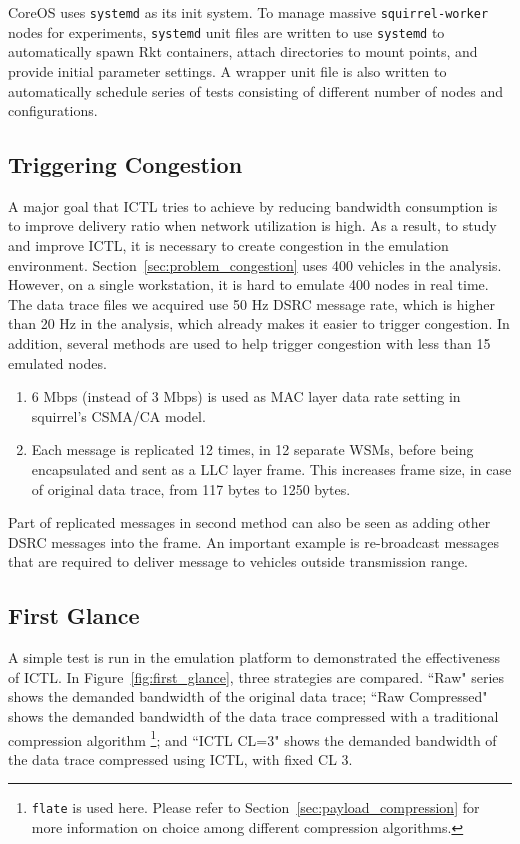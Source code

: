 \documentclass[12pt]{report}
\begin{document}
CoreOS uses \texttt{systemd} as its init system. To manage massive \texttt{squirrel-worker} nodes for experiments, \texttt{systemd} unit files are written to use \texttt{systemd} to automatically spawn Rkt containers, attach directories to mount points, and provide initial parameter settings. A wrapper unit file is also written to automatically schedule series of tests consisting of different number of nodes and configurations.

\subsection{Triggering Congestion}
\label{sec:trigger_congestion}

A major goal that ICTL tries to achieve by reducing bandwidth consumption is to improve delivery ratio when network utilization is high. As a result, to study and improve ICTL, it is necessary to create congestion in the emulation environment. Section~\ref{sec:problem_congestion} uses 400 vehicles in the analysis. However, on a single workstation, it is hard to emulate 400 nodes in real time. The data trace files we acquired use 50 Hz DSRC message rate, which is higher than 20 Hz in the analysis, which already makes it easier to trigger congestion. In addition, several methods are used to help trigger congestion with less than 15 emulated nodes.

\begin{enumerate}
  \item 6 Mbps (instead of 3 Mbps) is used as MAC layer data rate setting in squirrel's CSMA/CA model.
  \item Each message is replicated 12 times, in 12 separate WSMs, before being encapsulated and sent as a LLC layer frame. This increases frame size, in case of original data trace, from 117 bytes to 1250 bytes.
\end{enumerate}

Part of replicated messages in second method can also be seen as adding other DSRC messages into the frame. An important example is re-broadcast messages that are required to deliver message to vehicles outside transmission range.


\subsection{First Glance}

A simple test is run in the emulation platform to demonstrated the effectiveness of ICTL. In Figure~\ref{fig:first_glance}, three strategies are compared. ``Raw" series shows the demanded bandwidth of the original data trace; ``Raw Compressed" shows the demanded bandwidth of the data trace compressed with a traditional compression algorithm \footnote{\texttt{flate} is used here. Please refer to Section~\ref{sec:payload_compression} for more information on choice among different compression algorithms.}; and ``ICTL CL=3" shows the demanded bandwidth of the data trace compressed using ICTL, with fixed CL 3.
\end{document}
